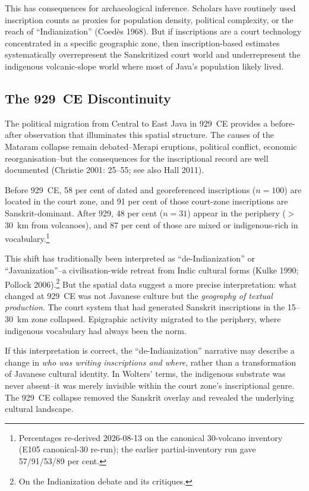 \documentclass[12pt,a4paper]{article}
\begin{document}
This has consequences for archaeological inference.
Scholars have routinely used inscription counts as proxies for population density, political complexity, or the reach of ``Indianization'' (Coed\`{e}s 1968).
But if inscriptions are a court technology concentrated in a specific geographic zone, then inscription-based estimates systematically overrepresent the Sanskritized court world and underrepresent the indigenous volcanic-slope world where most of Java's population likely lived.

\subsection{The 929~CE Discontinuity}

The political migration from Central to East Java in 929~CE provides a before-after observation that illuminates this spatial structure.
The causes of the Mataram collapse remain debated--Merapi eruptions, political conflict, economic reorganisation--but the consequences for the inscriptional record are well documented (Christie 2001: 25--55; see also Hall 2011).

Before 929~CE, 58 per cent of dated and georeferenced inscriptions ($n=100$) are located in the court zone, and 91 per cent of those court-zone inscriptions are Sanskrit-dominant.
After 929, 48 per cent ($n=31$) appear in the periphery ($>$30~km from volcanoes), and 87 per cent of those are mixed or indigenous-rich in vocabulary.\footnote{Percentages re-derived 2026-08-13 on the canonical 30-volcano inventory (E105 canonical-30 re-run); the earlier partial-inventory run gave 57/91/53/89 per cent.}

This shift has traditionally been interpreted as ``de-Indianization'' or ``Javanization''--a civilisation-wide retreat from Indic cultural forms (Kulke 1990; Pollock 2006).\footnote{On the Indianization debate and its critiques.}
But the spatial data suggest a more precise interpretation: what changed at 929~CE was not Javanese culture but the \emph{geography of textual production}.
The court system that had generated Sanskrit inscriptions in the 15--30~km zone collapsed.
Epigraphic activity migrated to the periphery, where indigenous vocabulary had always been the norm.

If this interpretation is correct, the ``de-Indianization'' narrative may describe a change in \emph{who was writing inscriptions and where}, rather than a transformation of Javanese cultural identity.
In Wolters' terms, the indigenous substrate was never absent--it was merely invisible within the court zone's inscriptional genre.
The 929~CE collapse removed the Sanskrit overlay and revealed the underlying cultural landscape.
\end{document}
